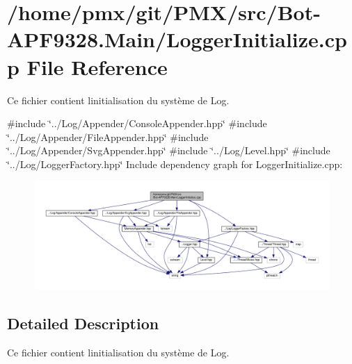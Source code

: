 \hypertarget{src_2Bot-APF9328_8Main_2LoggerInitialize_8cpp}{}\section{/home/pmx/git/\+P\+M\+X/src/\+Bot-\/\+A\+P\+F9328.Main/\+Logger\+Initialize.cpp File Reference}
\label{src_2Bot-APF9328_8Main_2LoggerInitialize_8cpp}


Ce fichier contient l\textquotesingle{}initialisation du système de Log.  


{\ttfamily \#include \char`\"{}../\+Log/\+Appender/\+Console\+Appender.\+hpp\char`\"{}}\newline
{\ttfamily \#include \char`\"{}../\+Log/\+Appender/\+File\+Appender.\+hpp\char`\"{}}\newline
{\ttfamily \#include \char`\"{}../\+Log/\+Appender/\+Svg\+Appender.\+hpp\char`\"{}}\newline
{\ttfamily \#include \char`\"{}../\+Log/\+Level.\+hpp\char`\"{}}\newline
{\ttfamily \#include \char`\"{}../\+Log/\+Logger\+Factory.\+hpp\char`\"{}}\newline
Include dependency graph for Logger\+Initialize.\+cpp\+:
\nopagebreak
\begin{figure}[H]
\begin{center}
\leavevmode
\includegraphics[width=350pt]{src_2Bot-APF9328_8Main_2LoggerInitialize_8cpp__incl}
\end{center}
\end{figure}


\subsection{Detailed Description}
Ce fichier contient l\textquotesingle{}initialisation du système de Log. 

